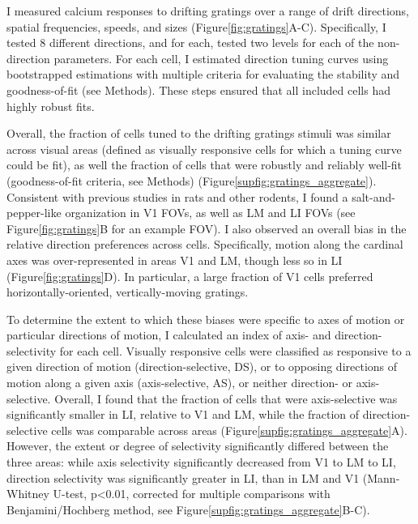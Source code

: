 I measured calcium responses to drifting gratings over a range of drift directions, spatial frequencies, speeds, and sizes (Figure\ref{fig:gratings}A-C). Specifically, I tested 8 different directions, and for each, tested two levels for each of the non-direction parameters. For each cell, I estimated direction tuning curves using bootstrapped estimations with multiple criteria for evaluating the stability and goodness-of-fit (see Methods)\cite{Liang2018}. These steps ensured that all included cells had highly robust fits. 

Overall, the fraction of cells tuned to the drifting gratings stimuli was similar across visual areas (defined as visually responsive cells for which a tuning curve could be fit), as well the fraction of cells that were robustly and reliably well-fit (goodness-of-fit criteria, see Methods) (Figure\ref{supfig:gratings_aggregate}). Consistent with previous studies in rats and other rodents, I found a salt-and-pepper-like organization in V1 FOVs, as well as LM and LI FOVs (see Figure\ref{fig:gratings}B for an example FOV). I also observed an overall bias in the relative direction preferences across cells. Specifically, motion along the cardinal axes was over-represented in areas V1 and LM, though less so in LI (Figure\ref{fig:gratings}D). In particular, a large fraction of V1 cells preferred horizontally-oriented, vertically-moving gratings.  

To determine the extent to which these biases were specific to axes of motion or particular directions of motion, I calculated an index of axis- and direction-selectivity for each cell. Visually responsive cells were classified as responsive to a given direction of motion (direction-selective, DS), or to opposing directions of motion along a given axis (axis-selective, AS), or neither direction- or axis-selective. Overall, I found that the fraction of cells that were axis-selective was significantly smaller in LI, relative to V1 and LM, while the fraction of direction-selective cells was comparable across areas (Figure\ref{supfig:gratings_aggregate}A). However, the extent or degree of selectivity significantly differed between the three areas: while axis selectivity significantly decreased from V1 to LM to LI, direction selectivity was significantly greater in LI, than in LM and V1 (Mann-Whitney U-test, p<0.01, corrected for multiple comparisons with Benjamini/Hochberg method, see Figure\ref{supfig:gratings_aggregate}B-C).

